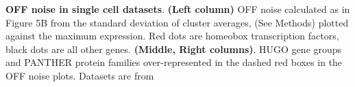 \textbf{OFF noise in single cell datasets}. \textbf{(Left column)} OFF noise calculated as in Figure 5B from the standard deviation of cluster averages, (See Methods) plotted against the maximum expression. Red dots are homeobox transcription factors, black dots are all other genes. \textbf{(Middle, Right columns)}. HUGO gene groups and PANTHER protein families over-represented in the dashed red boxes in the OFF noise plots. %
Datasets are from \citep{Zeisel_2015,Tasic_2016,Zeisel_2018,Saunders_2018,Tasci_2018}